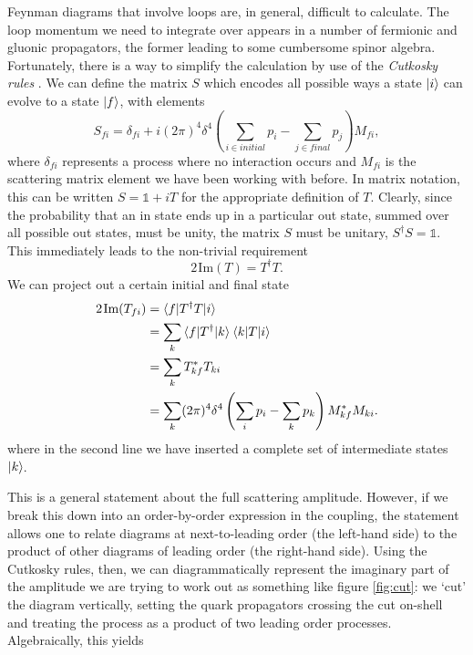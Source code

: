 Feynman diagrams that involve loops are, in general, difficult to calculate. The loop momentum we need to integrate over appears in a number of fermionic and gluonic propagators, the former leading to some cumbersome spinor algebra. Fortunately, there is a way to simplify the calculation by use of the \emph{Cutkosky rules} \cite{Cutkosky1960}. We can define the matrix $S$ which encodes all possible ways a state $\mathinner{\lvert i\rangle}_{\hspace{-0.1em}}$ can evolve to a state $\mathinner{\lvert f\rangle}_{\hspace{-0.1em}}$, with elements
\begin{equation}
S_{fi} = \delta_{fi} + i(2 \pi)^4 \delta^4 \left(\sum_{i \in initial} p_i - \sum_{j \in final} p_j \right) M_{fi},
\end{equation}
where $\delta_{fi}$ represents a process where no interaction occurs and $M_{fi}$ is the scattering matrix element we have been working with before. In matrix notation, this can be written $S = \mathbb{1} + i T$ for the appropriate definition of $T$. Clearly, since the probability that an in state ends up in a particular out state, summed over all possible out states, must be unity, the matrix $S$ must be unitary, $S^\dagger S = \mathbb{1}$. This immediately leads to the non-trivial requirement
\begin{equation}
2 \hspace{1pt} \text{Im}(T) = T^\dagger T.
\end{equation}
We can project out a certain initial and final state
\begin{equation}
\begin{split}
2 \hspace{1pt} \text{Im}(T_{fi}) &= \mathinner{\langle f\vert T^\dagger T\vert i\rangle}_{} \\
&= \sum_{k} \mathinner{\langle f\vert T^\dagger\vert k\rangle}_{} \mathinner{\langle k\vert T\vert i\rangle}_{} \\
&= \sum_k T_{kf}^* T_{ki} \\
&= \sum_k (2 \pi)^4 \delta^4 \left(\sum_{i} p_i - \sum_{k} p_k \right) M_{kf}^*M_{ki}.
\end{split}
\end{equation}
where in the second line we have inserted a complete set of intermediate states $\mathinner{\lvert k\rangle}_{\hspace{-0.1em}}$.

This is a general statement about the full scattering amplitude. However, if we break this down into an order-by-order expression in the coupling, the statement allows one to relate diagrams at next-to-leading order (the left-hand side) to the product of other diagrams of leading order (the right-hand side). Using the Cutkosky rules, then, we can diagrammatically represent the imaginary part of the amplitude we are trying to work out as something like figure \ref{fig:cut}: we `cut' the diagram vertically, setting the quark propagators crossing the cut on-shell and treating the process as a product of two leading order processes. Algebraically, this yields

